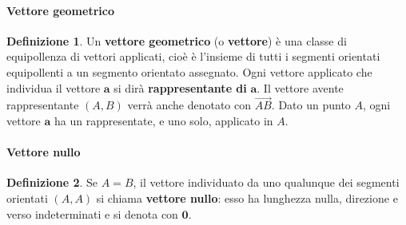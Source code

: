 \documentclass{article}
\theoremstyle{plain}
\theoremstyle{definition}
\newtheorem{defn}{Definizione}[section]
\theoremstyle{remark}
\begin{document}
\paragraph{Vettore geometrico}
\begin{bxthm}
\begin{defn}
    Un \textbf{vettore geometrico} (o \textbf{vettore}) è una classe di equipollenza di vettori applicati, cioè è l'insieme di tutti i segmenti orientati equipollenti a un segmento orientato assegnato.
    Ogni vettore applicato che individua il vettore $\mathbf{a}$ si dirà \textbf{rappresentante di }$\mathbf{a}$.
    Il vettore avente rappresentante $(A,B)$ verrà anche denotato con $\overrightarrow{AB}$.
    Dato un punto $A$, ogni vettore $\mathbf{a}$ ha un rappresentate, e uno solo, applicato in $A$.    
\end{defn}
\end{bxthm}

\vspace{10pt}

\paragraph{Vettore nullo}
\begin{bxthm}
\begin{defn}
    Se $A=B$, il vettore individuato da uno qualunque dei segmenti orientati $(A,A)$ si chiama \textbf{vettore nullo}: esso ha lunghezza nulla, direzione e verso indeterminati e si denota con $\mathbf{0}$.    
\end{defn}
\end{bxthm}

\vspace{10pt}
\end{document}
